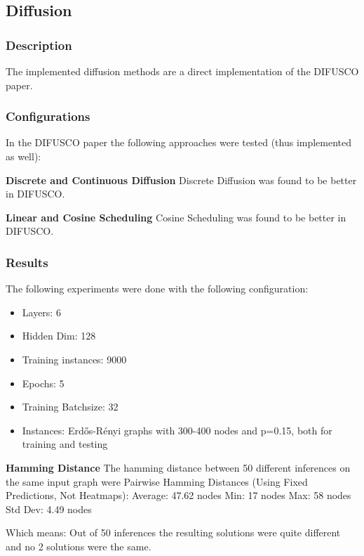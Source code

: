 \subsection{Diffusion}

\subsubsection{Description}
The implemented diffusion methods are a direct implementation of the DIFUSCO \cite{sun-23-difusco} paper. 

\subsubsection{Configurations}
In the DIFUSCO paper the following approaches were tested (thus implemented as well):
\par
\textbf{Discrete and Continuous Diffusion}
Discrete Diffusion was found to be better in DIFUSCO.

\par
\textbf{Linear and Cosine Scheduling}
Cosine Scheduling was found to be better in DIFUSCO.

\subsubsection{Results}
The following experiments were done with the following configuration:
\begin{itemize}
    \item Layers: 6
    \item Hidden Dim: 128
    \item Training instances: 9000
    \item Epochs: 5
    \item Training Batchsize: 32
    \item Instances: Erdős-Rényi graphs with 300-400 nodes and p=0.15, both for training and testing
\end{itemize}

\textbf{Hamming Distance}
The hamming distance between 50 different inferences on the same input graph were
Pairwise Hamming Distances (Using Fixed Predictions, Not Heatmaps):
      Average: 47.62 nodes
      Min:     17 nodes
      Max:     58 nodes
      Std Dev: 4.49 nodes

Which means: Out of 50 inferences the resulting solutions were quite different and no 2 solutions were the same.